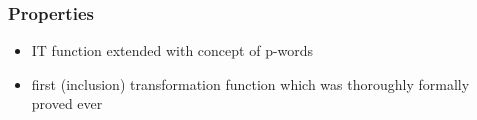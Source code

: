 \subsubsection{Properties}
\begin{itemize}
 \item IT function extended with concept of p-words
 \item first (inclusion) transformation function which was thoroughly formally proved ever
\end{itemize}
